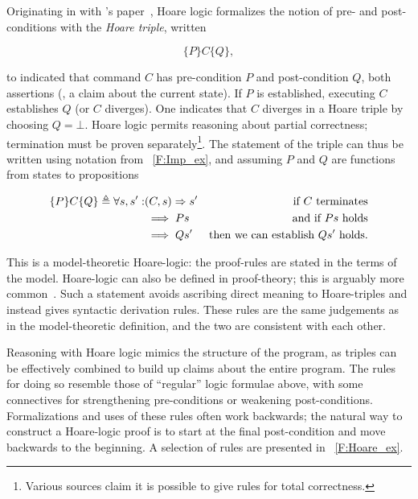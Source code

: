 Originating in \citeyear{Hoare_1969} with \citeauthor{Hoare_1969}'s
paper~\cite{Hoare_1969}, Hoare logic formalizes the notion of pre- and
post-conditions with the \emph{Hoare triple}, written

\begin{equation*}
    \{P\} C \{Q\},
\end{equation*}

to indicated that command \(C\) has pre-condition \(P\) and post-condition
\(Q\), both assertions (\eg, a claim about the current state). If \(P\) is
established, executing \(C\) establishes \(Q\) (or \(C\) diverges). One
indicates that \(C\) diverges in a Hoare triple by choosing \(Q = \bot\). Hoare
logic permits reasoning about partial correctness; termination must be proven
separately\footnote{Various sources claim it is possible to give rules for total
correctness.}. The statement of the triple can thus be written using notation
from \figurename~\ref{F:Imp_ex}, and assuming \(P\) and \(Q\) are functions from
states to propositions

\begin{align*}
    \{P\} C \{Q\} \triangleq \forall s, s' : &(C, s) \mathrel{\Rightarrow} s' &\text{if \(C\) terminates} \\
    &\implies P s &\text{and if \(P s\) holds} \\
    &\implies Q s' &\text{then we can establish \(Q s'\) holds.}
\end{align*}

This is a model-theoretic Hoare-logic: the proof-rules are stated in the terms
of the model. Hoare-logic can also be defined in proof-theory; this is arguably
more common~\cite[Ch. \emph{Hoare Logic as a Logic}]{Pierce:SF2}. Such a
statement avoids ascribing direct meaning to Hoare-triples and instead gives
syntactic derivation rules. These rules are the same judgements as in the
model-theoretic definition, and the two are consistent with each other.

Reasoning with Hoare logic mimics the structure of the program,
as triples can be effectively combined to build up claims about the entire
program. The rules for doing so resemble those of ``regular'' logic formulae
above, with some connectives for strengthening pre-conditions or weakening
post-conditions. Formalizations and uses of these rules often work backwards;
the natural way to construct a Hoare-logic proof is to start at the final
post-condition and move backwards to the beginning. A selection of rules are
presented in \figurename~\ref{F:Hoare_ex}.

